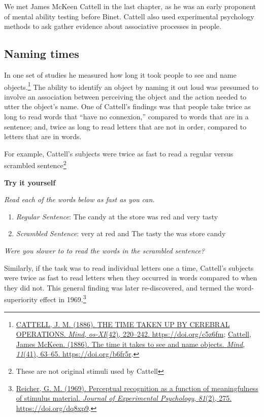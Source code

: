 \documentclass[
  oneside,
  12pt]{crumpbook}
\newenvironment{floatrightbox50}{%
  \wrapfigure{R}{.5\textwidth}%
  }{%
  \endwrapfigure}
\begin{document}
We met James McKeen Cattell in the last chapter, as he was an early proponent of mental ability testing before Binet. Cattell also used experimental psychology methods to ask gather evidence about associative processes in people.

\hypertarget{naming-times}{%
\subsection{Naming times}\label{naming-times}}

In one set of studies he measured how long it took people to see and name objects.\footnote{\protect\hyperlink{ref-cattellTIMETAKENCEREBRAL1886}{CATTELL, J. M. (1886). {THE TIME TAKEN UP BY CEREBRAL OPERATIONS}. \emph{Mind}, \emph{os-XI}(42), 220--242. \url{https://doi.org/c5z6fm}}; \protect\hyperlink{ref-cattellTimeItTakes1886}{Cattell, James McKeen. (1886). The time it takes to see and name objects. \emph{Mind}, \emph{11}(41), 63--65. \url{https://doi.org/b6fr5r}}.} The ability to identify an object by naming it out loud was presumed to involve an association between perceiving the object and the action needed to utter the object's name. One of Cattell's findings was that people take twice as long to read words that ``have no connexion,'' compared to words that are in a sentence; and, twice as long to read letters that are not in order, compared to letters that are in words.

For example, Cattell's subjects were twice as fast to read a regular versus scrambled sentence\footnote{These are not original stimuli used by Cattell}

\begin{floatrightbox50}
\textbf{Try it yourself}

\emph{Read each of the words below as fast as you can.}

\begin{enumerate}
\def\labelenumi{\arabic{enumi}.}
\item
  \emph{Regular Sentence}: The candy at the store was red and very tasty
\item
  \emph{Scrambled Sentence}: very at red and The tasty the was store candy
\end{enumerate}

\emph{Were you slower to to read the words in the scrambled sentence?}

\end{floatrightbox50}

Similarly, if the task was to read individual letters one a time, Cattell's subjects were twice as fast to read letters when they occurred in words compared to when they did not. This general finding was later re-discovered, and termed the word-superiority effect in 1969.\footnote{\protect\hyperlink{ref-reicherPerceptualRecognitionFunction1969}{Reicher, G. M. (1969). Perceptual recognition as a function of meaningfulness of stimulus material. \emph{Journal of Experimental Psychology}, \emph{81}(2), 275. \url{https://doi.org/dq8xp9}}.}
\end{document}
